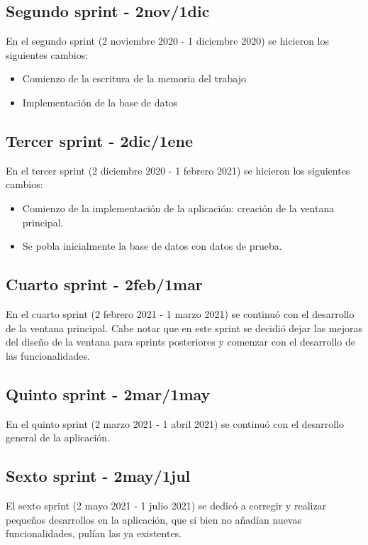 \subsection{Segundo sprint - 2nov/1dic}

En el segundo sprint (2 noviembre 2020 - 1 diciembre 2020) se hicieron los siguientes cambios:
\begin{itemize}
	\item Comienzo de la escritura de la memoria del trabajo
	\item Implementación de la base de datos
\end{itemize}

\subsection{Tercer sprint - 2dic/1ene}

En el tercer sprint (2 diciembre 2020 - 1 febrero 2021) se hicieron los siguientes cambios:
\begin{itemize}
	\item Comienzo de la implementación de la aplicación: creación de la ventana principal.
	\item Se pobla inicialmente la base de datos con datos de prueba.
\end{itemize}

\subsection{Cuarto sprint - 2feb/1mar}

En el cuarto sprint (2 febrero 2021 - 1 marzo 2021) se continuó con el desarrollo de la ventana principal. Cabe notar que en este sprint se decidió dejar las mejoras del diseño de la ventana para sprints posteriores y comenzar con el desarrollo de las funcionalidades.

\subsection{Quinto sprint - 2mar/1may}

En el quinto sprint (2 marzo 2021 - 1 abril 2021) se continuó con el desarrollo general de la aplicación.

\subsection{Sexto sprint - 2may/1jul}

El sexto sprint (2 mayo 2021 - 1 julio 2021) se dedicó a corregir y realizar pequeños desarrollos en la aplicación, que si bien no añadían nuevas funcionalidades, pulían las ya existentes.

